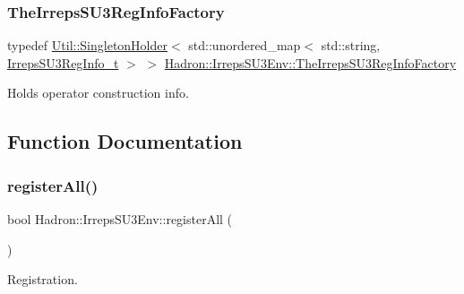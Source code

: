 \subsubsection{\texorpdfstring{TheIrrepsSU3RegInfoFactory}{TheIrrepsSU3RegInfoFactory}}
{\footnotesize\ttfamily typedef \mbox{\hyperlink{classUtil_1_1SingletonHolder}{Util\+::\+Singleton\+Holder}}$<$ std\+::unordered\+\_\+map$<$ std\+::string, \mbox{\hyperlink{structHadron_1_1IrrepsSU3Env_1_1IrrepsSU3RegInfo__t}{Irreps\+S\+U3\+Reg\+Info\+\_\+t}} $>$ $>$ \mbox{\hyperlink{namespaceHadron_1_1IrrepsSU3Env_afae3999d49fb44dd4174d52c7857e0a0}{Hadron\+::\+Irreps\+S\+U3\+Env\+::\+The\+Irreps\+S\+U3\+Reg\+Info\+Factory}}}



Holds operator construction info. 



\subsection{Function Documentation}
\mbox{\label{namespaceHadron_1_1IrrepsSU3Env_a7f85fa639d12623fddad0c09ba7ddef8}} 
\subsubsection{\texorpdfstring{registerAll()}{registerAll()}}
{\footnotesize\ttfamily bool Hadron\+::\+Irreps\+S\+U3\+Env\+::register\+All (\begin{DoxyParamCaption}{ }\end{DoxyParamCaption})}



Registration. 

